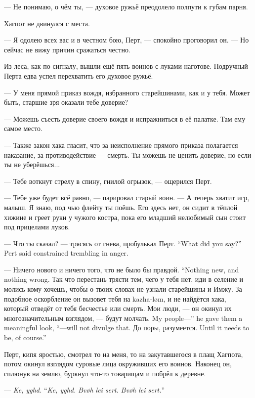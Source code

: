 --- Не понимаю, о чём ты, --- духовое ружьё преодолело полпути к губам парня.

Хагпот не двинулся с места.

--- Я одолею всех вас и в честном бою, Перт, --- спокойно проговорил он.
--- Но сейчас не вижу причин сражаться честно.

Из леса, как по сигналу, вышли ещё пять воинов с луками наготове.
Подручный Перта едва успел перехватить его духовое ружьё.

--- У меня прямой приказ вождя, избранного старейшинами, как и у тебя.
Может быть, старшие зря оказали тебе доверие?

--- Можешь съесть доверие своего вождя и испражниться в её палатке.
Там ему самое место.

--- Также закон хака гласит, что за неисполнение прямого приказа полагается наказание, за противодействие --- смерть.
Ты можешь не ценить доверие, но если ты не уберёшься...

--- Тебе воткнут стрелу в спину, гнилой огрызок, --- ощерился Перт.

--- Тебе уже будет всё равно, --- парировал старый воин.
--- А теперь хватит игр, малыш.
Я знаю, под чью флейту ты поёшь.
Его здесь нет, он сидит в тёплой хижине и греет руки у чужого костра, пока его младший нелюбимый сын стоит под прицелами луков.

{--- Что ты сказал? --- трясясь от гнева, пробулькал Перт.}
{``What did you say?'' Pert said constrained trembling in anger.}

{--- Ничего нового и ничего того, что не было бы правдой.}
{``Nothing new, and nothing wrong.}
Так что перестань трясти тем, чего у тебя нет, иди в селение и молись кому хочешь, чтобы о твоих словах не узнали старейшины и Имжу.
За подобное оскорбление он вызовет тебя на kazha-l\o m, и не найдётся хака, который отведёт от тебя бесчестье или смерть.
{Мои люди, --- он окинул их многозначительным взглядом, --- будут молчать.}
{My people---'' he gave them a meaningful look, ``---will not divulge that.}
{До поры, разумеется.}
{Until it needs to be, of course.''}

Перт, кипя яростью, смотрел то на меня, то на закутавшегося в плащ Хагпота, потом окинул взглядом суровые лица окруживших его воинов.
Наконец он, сплюнув на землю, буркнул что-то товарищам и побрёл к деревне.

{--- \textit{Ke, yghd.}}
{``\textit{Ke, yghd.}}
{\textit{Bv\o{}h lei sert.}}
{\textit{Bv\o h lei sert.}''}

